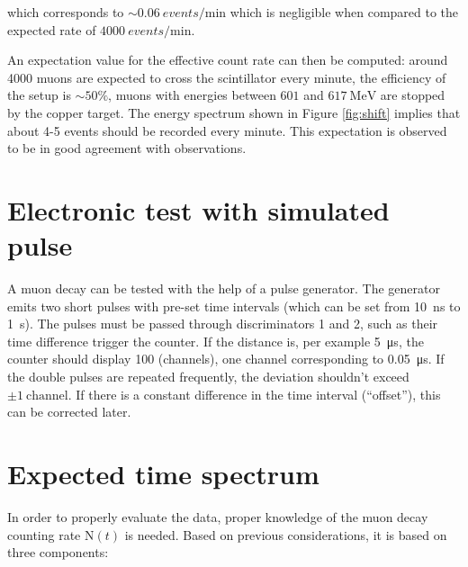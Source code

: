 which corresponds to $\sim \SI{0.06}{events\per\minute}$ which is negligible when compared to the expected rate of $\SI{4000}{events\per\minute}$.

An expectation value for the effective count rate can then be computed: around 4000 muons are expected to cross the scintillator every minute, the efficiency of the setup is $\sim 50\%$, muons with energies between $601$ and $\SI{617}{\mega\electronvolt}$ are stopped by the copper target. The energy spectrum shown in Figure \ref{fig:shift} implies that about 4-5 events should be recorded every minute. This expectation is observed to be in good agreement with observations.

\section{Electronic test with simulated pulse}

A muon decay can be tested with the help of a pulse generator. The generator emits two short pulses with pre-set time intervals (which can be set from \SI{10}{\nano\second} to \SI{1}{\second}). The pulses must be passed through discriminators 1 and 2, such as their time difference trigger the counter. If the distance is, per example \SI{5}{\micro\second}, the counter should display 100 (channels), one channel corresponding to \SI{0.05}{\micro\second}. If the double pulses are repeated frequently, the deviation shouldn't exceed $\pm\SI{1}{\text{channel}}$. If there is a constant difference in the time interval (``offset''), this can be corrected later.

\section{Expected time spectrum}

In order to properly evaluate the data, proper knowledge of the muon decay counting rate $\text{N}(t)$ is needed. Based on previous considerations, it is based on three components:

